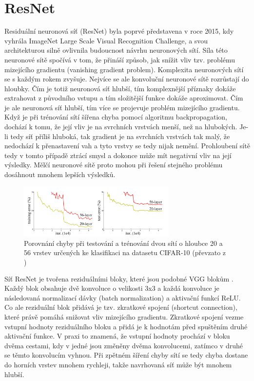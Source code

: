 \section{ResNet}
Residuální neuronová síť (ResNet) \cite{ResNet} byla poprvé představena v roce 2015, kdy vyhrála ImageNet Large Scale Visual Recognition Challenge, a svou architekturou silně ovlivnila budoucnost návrhu neuronových sítí.
Síla této neuronové sítě spočívá v tom, že přináší způsob, jak snížit vliv tzv. problému mizejícího gradientu (vanishing gradient problem).
Komplexita neuronových sítí se s každým rokem zvyšuje. Nejvíce se ale konvoluční neuronové sítě rozrůstají do hloubky. Čím je totiž neuronová síť hlubší, tím komplexnější příznaky dokáže extrahovat z původního vstupu a tím složitější funkce dokáže aproximovat.
Čím je ale neuronová síť hlubší, tím více se projevuje problém mizejícího gradientu.
Když je při trénování sítí šířena chyba pomocí algoritmu backpropagation, dochází k tomu, že její vliv je na svrchních vrstvách menší, než na hlubokých. Je-li tedy síť příliš hluboká, tak gradient je na svrchních vrstvách tak malý, že nedochází k přenastavení vah a tyto vrstvy se tedy nijak nemění.
Prohloubení sítě tedy v tomto případě ztrácí smysl a dokonce může mít negativní vliv na její výsledky.
Mělčí neuronové sítě proto mohou při řešení stejného problému dosáhnout mnohem lepších výsledků.

\begin{figure}[h!]
	\centering
	\includegraphics[width=0.7\textwidth]{Figures/solution/vanishing_gradient.png}
	\caption{Porovnání chyby při testování a trénování dvou sítí o hloubce 20 a 56 vrstev určených ke klasifikaci na datasetu CIFAR-10 (převzato z \cite{ResNet})}
\end{figure}

Síť ResNet je tvořena reziduálními bloky, které jsou podobné VGG blokům \cite{VGG}.
Každý blok obsahuje dvě konvoluce o velikosti 3x3 a každá konvoluce je následovaná normalizací dávky (batch normalization) a aktivační funkcí ReLU.
Co ale reziduální blok přidává je tzv. zkratkové spojení (shortcut connection), které právě pomáhá snižovat vliv mizejícího gradientu.
Zkratkové spojení vezme vstupní hodnoty reziduálního bloku a přidá je k hodnotám před spuštěním druhé aktivační funkce.
V praxi to znamená, že vstupní hodnoty prochází v bloku dvěma cestami, kdy v jedné jsou změněny dvěma konvolucemi, zatímco v druhé se těmto konvolucím vyhnou. Při zpětném šíření chyby sítí se tedy chyba dostane do horních vrstev mnohem rychleji, takže navrhovaná síť může být mnohem hlubší.

